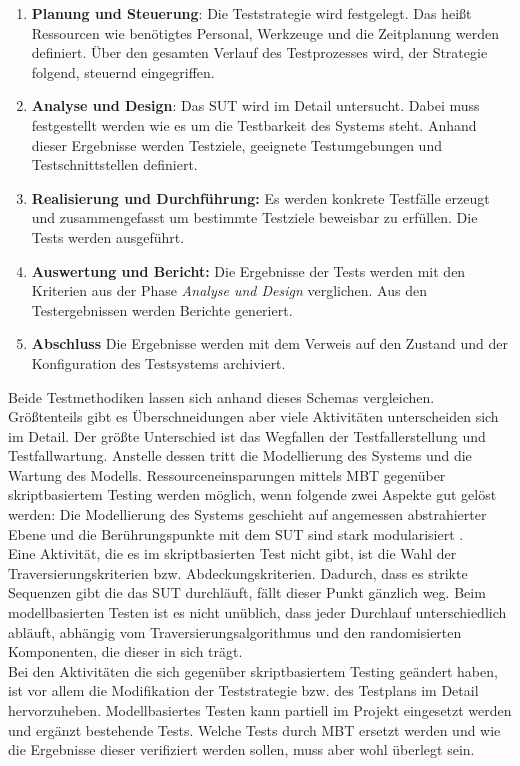 \begin{enumerate}
\item \textbf{Planung und Steuerung}: Die Teststrategie wird festgelegt. Das heißt Ressourcen wie benötigtes Personal, Werkzeuge und die Zeitplanung werden definiert. Über den gesamten Verlauf des Testprozesses wird, der Strategie folgend, steuernd eingegriffen.
\item \textbf{Analyse und Design}: Das \Gls{SUT} wird im Detail untersucht. Dabei muss festgestellt werden wie es um die Testbarkeit des Systems steht. Anhand dieser Ergebnisse werden Testziele, geeignete Testumgebungen und Testschnittstellen definiert.
\item \textbf{Realisierung und Durchführung:} Es werden konkrete Testfälle erzeugt und zusammengefasst um bestimmte Testziele beweisbar zu erfüllen. Die Tests werden ausgeführt.
\item \textbf{Auswertung und Bericht:} Die Ergebnisse der Tests werden mit den Kriterien aus der Phase \textit{Analyse und Design} verglichen. Aus den Testergebnissen werden Berichte generiert.
\item \textbf{Abschluss} Die Ergebnisse werden mit dem Verweis auf den Zustand und der Konfiguration des Testsystems archiviert.
\end{enumerate}


Beide Testmethodiken lassen sich anhand dieses Schemas vergleichen. Größtenteils gibt es Überschneidungen aber viele Aktivitäten unterscheiden sich im Detail. Der größte Unterschied ist das Wegfallen der Testfallerstellung und Testfallwartung. Anstelle dessen tritt die Modellierung des Systems und die Wartung des Modells. Ressourceneinsparungen mittels \Gls{MBT} gegenüber skriptbasiertem Testing werden möglich, wenn folgende zwei Aspekte gut gelöst werden: Die Modellierung des Systems geschieht auf angemessen abstrahierter Ebene und die Berührungspunkte mit dem \Gls{SUT} sind stark modularisiert \cite{utting_practical_2007}.\\
Eine Aktivität, die es im skriptbasierten Test nicht gibt, ist die Wahl der Traversierungskriterien bzw. Abdeckungskriterien. Dadurch, dass es strikte Sequenzen gibt die das \Gls{SUT} durchläuft, fällt dieser Punkt gänzlich weg. Beim modellbasierten Testen ist es nicht unüblich, dass jeder Durchlauf unterschiedlich abläuft, abhängig vom Traversierungsalgorithmus und den randomisierten Komponenten, die dieser in sich trägt.\\
Bei den Aktivitäten die sich gegenüber skriptbasiertem Testing geändert haben, ist vor allem die Modifikation der Teststrategie bzw. des Testplans im Detail hervorzuheben. Modellbasiertes Testen kann partiell im Projekt eingesetzt werden und ergänzt bestehende Tests. Welche Tests durch \Gls{MBT} ersetzt werden und wie die Ergebnisse dieser verifiziert werden sollen, muss aber wohl überlegt sein.

